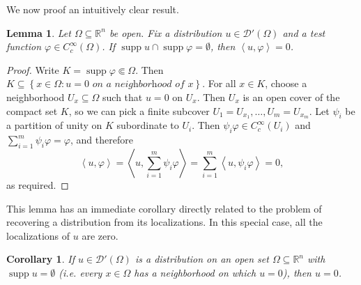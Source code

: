 \documentclass{book}
\newcommand{\scrD}{\mathscr{D}}
\newcommand{\bbR}{\mathbb{R}}
\renewcommand{\phi}{\varphi}
\newcommand{\set}[1]{\left\{ {#1} \right\}}
\newcommand{\angles}[1]{\left\langle {#1} \right\rangle}
\DeclareMathOperator{\supp}{supp}
\newtheorem{lemma}[theorem]{Lemma}
\newtheorem{corollary}[theorem]{Corollary}
\theoremstyle{definition}
\theoremstyle{remark}
\numberwithin{equation}{chapter}
\begin{document}
We now proof an intuitively clear result.
\begin{lemma} \label{lem:disjointSupportsImplyPairingIsZero}
    Let $\Omega \subseteq \bbR^n$ be open. Fix a distribution $u \in \scrD'(\Omega)$ and a test function $\phi \in C_c^\infty(\Omega)$. If $\supp{u} \cap \supp{\phi} = \emptyset$, then $\angles{ u,\phi } = 0$.
\end{lemma}
\begin{proof}
    Write $K = \supp{\phi} \Subset \Omega$. Then $K \subseteq \set{ x \in \Omega : u = 0 \textit{ on a neighborhood of } x }$. For all $x \in K$, choose a neighborhood $U_x \subseteq \Omega$ such that $u = 0$ on $U_x$. Then $U_x$ is an open cover of the compact set $K$, so we can pick a finite subcover $U_1 = U_{x_1},\dots,U_m = U_{x_m}$. Let $\psi_i$ be a partition of unity on $K$ subordinate to $U_i$. Then $\psi_i \phi \in C_c^\infty(U_i)$ and $\sum_{i=1}^m \psi_i \phi = \phi$, and therefore 
    \begin{equation}
        \angles{ u,\phi } = \angles{ u, \sum_{i=1}^m \psi_i \phi } = \sum_{i=1}^m \angles{ u,\psi_i \phi} = 0,
    \end{equation}
    as required.
\end{proof}
This lemma has an immediate corollary directly related to the problem of recovering a distribution from its localizations. In this special case, all the localizations of $u$ are zero.
\begin{corollary} \label{cor:recoveringDistributionsWhoseLocalizationsAreZero}
    If $u \in \scrD'(\Omega)$ is a distribution on an open set $\Omega \subseteq \bbR^n$ with $\supp{u} = \emptyset$ (i.e. every $x \in \Omega$ has a neighborhood on which $u = 0$), then $u = 0$.
\end{corollary}
\end{document}
